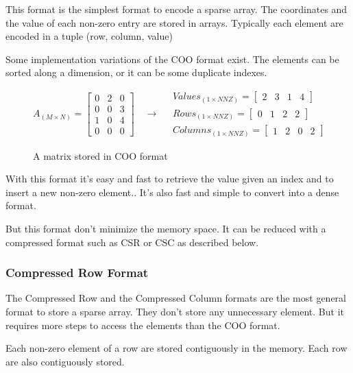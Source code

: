 This format is the simplest format to encode a sparse array. The coordinates and the value of each non-zero entry are stored in arrays.
Typically each element are encoded in a tuple (row, column, value)

Some implementation variations of the COO format exist. The elements can be sorted along a dimension, or it can be some duplicate indexes.

\begin{figure}[h]
	\[
	A_{(M\times N)} = 
	\begin{bmatrix}
	0 &  2 & 0 \\
	0 &  0 & 3 \\
	1 &  0 & 4\\
	0 &  0 & 0
	\end{bmatrix}
	\quad\rightarrow\quad
	\begin{aligned}
	Values_{(1\times NNZ)} = 
	\begin{bmatrix}
	2 &  3 & 1 & 4
	\end{bmatrix}
	\\
	Rows_{(1\times NNZ)} = 
	\begin{bmatrix}
	0 &  1 & 2 & 2
	\end{bmatrix}
	\\
	Columns_{(1\times NNZ)} = 
	\begin{bmatrix}
	1 &  2 & 0 & 2
	\end{bmatrix}
	\end{aligned}
	\]
	\caption{A matrix stored in COO format}
\end{figure}

With this format it's easy and fast to retrieve the value given an index and to insert a new non-zero element.. It's also fast and simple to convert into a dense format.

But this format don't minimize the memory space. It can be reduced with a compressed format such as CSR or CSC as described below.

\subsubsection{Compressed Row Format}

The Compressed Row and the Compressed Column formats are the most general format to store a sparse array. They don't store any unnecessary element. But it requires more steps to access the elements than the COO format. 

Each non-zero element of a row are stored contiguously in the memory. Each row are also contiguously stored.

